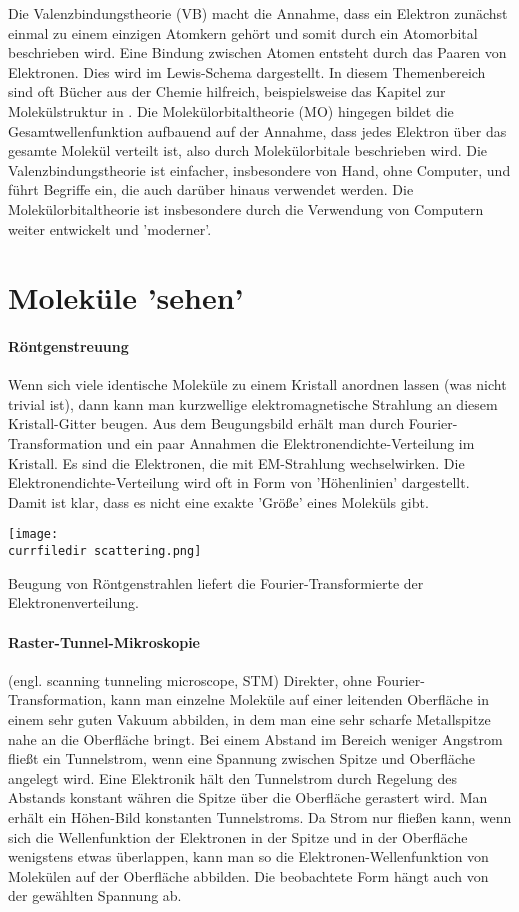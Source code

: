 Die Valenzbindungstheorie (VB) macht die Annahme, dass ein Elektron zunächst einmal zu einem einzigen Atomkern gehört und somit durch ein Atomorbital beschrieben wird. Eine Bindung zwischen Atomen entsteht durch das Paaren von Elektronen. Dies wird im Lewis-Schema dargestellt. In diesem Themenbereich sind oft Bücher aus der Chemie hilfreich, beispielsweise das Kapitel zur Molekülstruktur in \cite{Atkins}.
Die Molekülorbitaltheorie (MO) hingegen bildet die Gesamtwellenfunktion aufbauend auf der Annahme, dass jedes Elektron über das gesamte Molekül verteilt ist, also durch Molekülorbitale beschrieben wird. Die Valenzbindungstheorie ist einfacher, insbesondere von Hand, ohne Computer, und führt Begriffe ein, die auch darüber hinaus verwendet werden. Die Molekülorbitaltheorie ist insbesondere durch die Verwendung von Computern weiter entwickelt und 'moderner'.



\section{Moleküle 'sehen'}

\paragraph{Röntgenstreuung} Wenn sich viele identische Moleküle zu einem Kristall anordnen lassen (was nicht trivial ist), dann kann man kurzwellige elektromagnetische Strahlung an diesem  Kristall-Gitter beugen. Aus dem Beugungsbild erhält man durch Fourier-Transformation und ein paar Annahmen die Elektronendichte-Verteilung im Kristall. Es sind die Elektronen, die mit EM-Strahlung wechselwirken. Die Elektronendichte-Verteilung wird oft in Form von 'Höhenlinien' dargestellt. Damit ist klar, dass es nicht eine exakte 'Größe' eines Moleküls gibt.

\begin{marginfigure}
\texttt{[image: \\currfiledir scattering.png]}
\caption{Beugung von Röntgenstrahlen liefert die Fourier-Transformierte der Elektronenverteilung.
}
\end{marginfigure}


\paragraph{Raster-Tunnel-Mikroskopie} (engl. scanning tunneling microscope, STM) Direkter, ohne Fourier-Transformation, kann man einzelne Moleküle auf einer leitenden Oberfläche in einem sehr guten Vakuum abbilden, in dem man eine sehr scharfe Metallspitze nahe an die Oberfläche bringt. Bei einem Abstand im Bereich weniger Angstrom fließt ein Tunnelstrom, wenn eine Spannung zwischen Spitze und Oberfläche angelegt wird. Eine Elektronik hält den Tunnelstrom durch Regelung des Abstands konstant währen die Spitze über die Oberfläche gerastert wird. Man erhält ein Höhen-Bild konstanten Tunnelstroms. Da Strom nur fließen kann, wenn sich die Wellenfunktion der Elektronen in der Spitze und in der Oberfläche wenigstens etwas überlappen, kann man so die Elektronen-Wellenfunktion von Molekülen auf der Oberfläche abbilden. Die beobachtete Form hängt auch von der gewählten Spannung ab.


